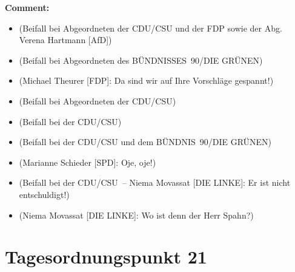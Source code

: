 \documentclass{article}
\begin{document}
\noindent\textbf{Comment:}
\begin{itemize}
    \setlength\itemsep{-3pt}
    \item (Beifall bei Abgeordneten der CDU/CSU und der FDP sowie der Abg. Verena Hartmann [AfD])
    \setlength\itemsep{-3pt}
    \item (Beifall bei Abgeordneten des BÜNDNISSES 90/DIE GRÜNEN)
    \setlength\itemsep{-3pt}
    \item (Michael Theurer [FDP]: Da sind wir auf Ihre Vorschläge gespannt!)
    \setlength\itemsep{-3pt}
    \item (Beifall bei Abgeordneten der CDU/CSU)
    \setlength\itemsep{-3pt}
    \item (Beifall bei der CDU/CSU)
    \setlength\itemsep{-3pt}
    \item (Beifall bei der CDU/CSU und dem BÜNDNIS 90/DIE GRÜNEN)
    \setlength\itemsep{-3pt}
    \item (Marianne Schieder [SPD]: Oje, oje!)
    \setlength\itemsep{-3pt}
    \item (Beifall bei der CDU/CSU – Niema Movassat [DIE LINKE]: Er ist nicht entschuldigt!)
    \setlength\itemsep{-3pt}
    \item (Niema Movassat [DIE LINKE]: Wo ist denn der Herr Spahn?)
\end{itemize}
\section{Tagesordnungspunkt 21}
\end{document}
